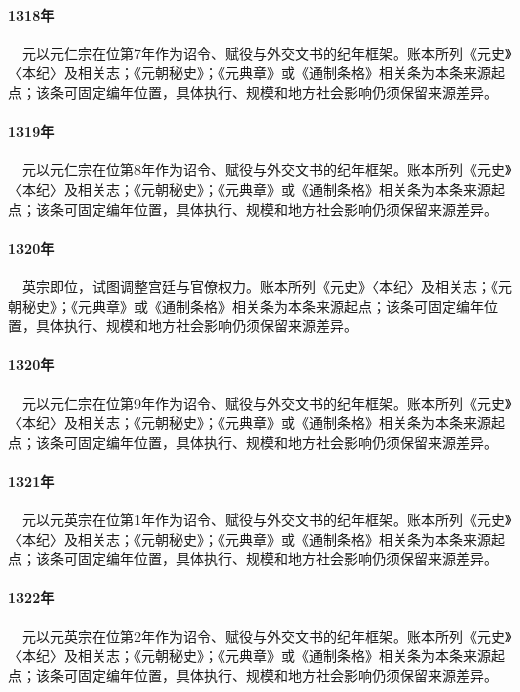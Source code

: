 \paragraph{1318年}　元以元仁宗在位第7年作为诏令、赋役与外交文书的纪年框架。账本所列《元史》〈本纪〉及相关志；《元朝秘史》；《元典章》或《通制条格》相关条为本条来源起点；该条可固定编年位置，具体执行、规模和地方社会影响仍须保留来源差异。

\paragraph{1319年}　元以元仁宗在位第8年作为诏令、赋役与外交文书的纪年框架。账本所列《元史》〈本纪〉及相关志；《元朝秘史》；《元典章》或《通制条格》相关条为本条来源起点；该条可固定编年位置，具体执行、规模和地方社会影响仍须保留来源差异。

\paragraph{1320年}　英宗即位，试图调整宫廷与官僚权力。账本所列《元史》〈本纪〉及相关志；《元朝秘史》；《元典章》或《通制条格》相关条为本条来源起点；该条可固定编年位置，具体执行、规模和地方社会影响仍须保留来源差异。

\paragraph{1320年}　元以元仁宗在位第9年作为诏令、赋役与外交文书的纪年框架。账本所列《元史》〈本纪〉及相关志；《元朝秘史》；《元典章》或《通制条格》相关条为本条来源起点；该条可固定编年位置，具体执行、规模和地方社会影响仍须保留来源差异。

\paragraph{1321年}　元以元英宗在位第1年作为诏令、赋役与外交文书的纪年框架。账本所列《元史》〈本纪〉及相关志；《元朝秘史》；《元典章》或《通制条格》相关条为本条来源起点；该条可固定编年位置，具体执行、规模和地方社会影响仍须保留来源差异。

\paragraph{1322年}　元以元英宗在位第2年作为诏令、赋役与外交文书的纪年框架。账本所列《元史》〈本纪〉及相关志；《元朝秘史》；《元典章》或《通制条格》相关条为本条来源起点；该条可固定编年位置，具体执行、规模和地方社会影响仍须保留来源差异。

